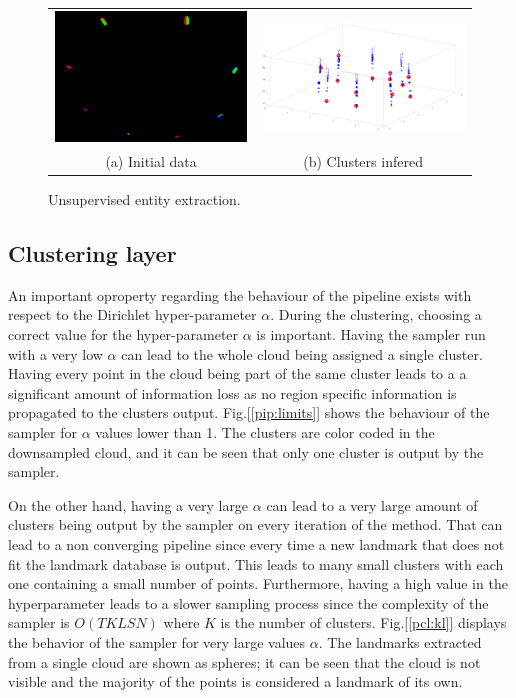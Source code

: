 \documentclass[twoside,hidelinks]{article}
\begin{document}
\begin{figure}[!ht]
\begin{tabular}{cc}
    \includegraphics[width=.5\textwidth]{8boxesData} &  \includegraphics[width=.5\textwidth]{8boxes} \\
  (a) Initial data  & (b) Clusters infered \\[6pt]
\end{tabular}
\caption{Unsupervised entity extraction.}
  \label{pip:beh}
\end{figure}


\subsection{Clustering layer}

An important oproperty regarding the behaviour of the pipeline exists with respect to the Dirichlet hyper-parameter $\alpha$. During the clustering, choosing a correct value for the hyper-parameter $\alpha$ is important. Having the sampler run with a very low $\alpha$ can lead to the whole cloud being assigned a single cluster. Having every point in the cloud being part of the same cluster leads to a a significant amount of information loss as no region specific information is propagated to the clusters output. Fig.[\ref{pip:limits}] shows the behaviour of the sampler for $\alpha$ values lower than 1. The clusters are color coded in the downsampled cloud, and it can be seen that only one cluster is output by the sampler.

On the other hand, having a very large $\alpha$ can lead to a very large amount of clusters being output by the sampler on every iteration of the method. That can lead to a non converging pipeline since every time a new landmark that does not fit the landmark database is output. This leads to many small clusters with each one containing a small number of points. Furthermore, having a high value in the hyperparameter leads to a slower sampling process since the complexity of the sampler is $O(TKLSN)$ where $K$ is the number of clusters. Fig.[\ref{pcl:kl}] displays the behavior of the sampler for very large values $\alpha$. The landmarks extracted from a single cloud are shown as spheres; it can be seen that the cloud is not visible and the majority of the points is considered a landmark of its own.
\end{document}
